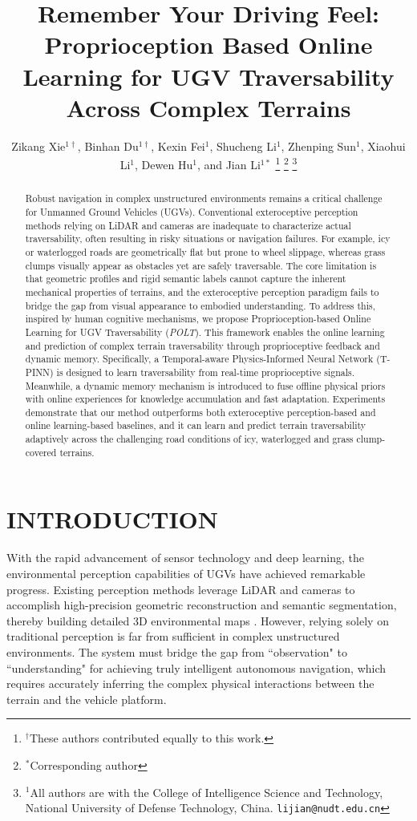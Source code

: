 \documentclass[letterpaper, 10 pt, conference]{ieeeconf}  %
\title{\LARGE \bf
Remember Your Driving Feel: Proprioception Based Online Learning for UGV Traversability Across Complex Terrains
}
\author{\small Zikang Xie$^{1\dagger}$, Binhan Du$^{1\dagger}$, Kexin Fei$^{1}$, Shucheng Li$^{1}$, Zhenping Sun$^{1}$, Xiaohui Li$^{1}$, Dewen Hu$^{1}$, and Jian Li$^{1*}$
\thanks{$^{\dagger}$These authors contributed equally to this work.}%
\thanks{$^{*}$Corresponding author}%
\thanks{$^{1}$All authors are with the College of Intelligence Science and Technology, National University of Defense Technology, China. 
        {\tt\small lijian@nudt.edu.cn}}%
}
\begin{document}
\maketitle

\thispagestyle{empty}
\pagestyle{empty}




\begin{abstract}

Robust navigation in complex unstructured environments remains a critical challenge for Unmanned Ground Vehicles (UGVs). Conventional exteroceptive perception methods relying on LiDAR and cameras are inadequate to characterize actual traversability, often resulting in risky situations or navigation failures. For example, icy or waterlogged roads are geometrically flat but prone to wheel slippage, whereas grass clumps visually appear as obstacles yet are safely traversable. The core limitation is that geometric profiles and rigid semantic labels cannot capture the inherent mechanical properties of terrains, and the exteroceptive perception paradigm fails to bridge the gap from visual appearance to embodied understanding. To address this, inspired by human cognitive mechanisms, we propose Proprioception-based Online Learning for UGV Traversability (\textit{POLT}). This framework enables the online learning and prediction of complex terrain traversability through proprioceptive feedback and dynamic memory. Specifically, a Temporal-aware Physics-Informed Neural Network (T-PINN) is designed to learn traversability from real-time proprioceptive signals. Meanwhile, a dynamic memory mechanism is introduced to fuse offline physical priors with online experiences for knowledge accumulation and fast adaptation. Experiments demonstrate that our method  outperforms both exteroceptive perception-based and online learning-based baselines, and it can learn and predict terrain traversability adaptively across the challenging road conditions of icy, waterlogged and grass clump-covered terrains.

\end{abstract}

\section{INTRODUCTION}

With the rapid advancement of sensor technology and deep learning, the environmental perception capabilities of UGVs have achieved remarkable progress. Existing perception methods leverage LiDAR and cameras to accomplish high-precision geometric reconstruction and semantic segmentation, thereby building detailed 3D environmental maps \cite{c1, c2}. However, relying solely on traditional perception is far from sufficient in complex unstructured environments. The system must bridge the gap from ``observation" to ``understanding" for achieving truly intelligent autonomous navigation, which requires accurately inferring the complex physical interactions between the terrain and the vehicle platform.
\end{document}
